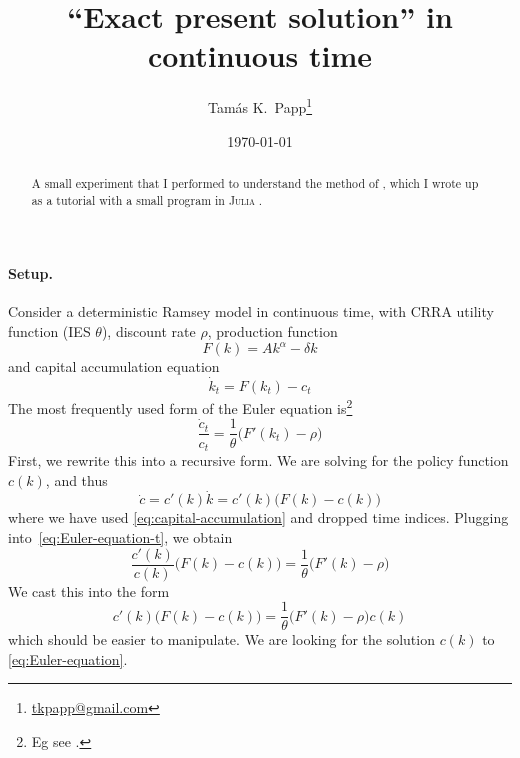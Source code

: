 \documentclass[a4paper,11pt]{article}
\begin{document}
\title{``Exact present solution'' in continuous time}
\author{Tam\'as K.~Papp\thanks{\url{tkpapp@gmail.com}}}
\date{\today}
\maketitle

\begin{abstract}
  A small experiment that I performed to understand the method of \textcite{den2015exact}, which I wrote up as a tutorial with a small program in \textsc{Julia} \parencite{bezanson17:_julia}.
\end{abstract}

\begin{center}
\end{center}
\paragraph{Setup.} Consider a deterministic Ramsey model in continuous time, with CRRA utility function (IES $\theta$), discount rate $\rho$, production function
\begin{equation}
  F(k) = A k^\alpha - \delta k
\end{equation}
and capital accumulation equation
\begin{equation}
  \label{eq:capital-accumulation}
  \dot{k}_t = F(k_t) - c_t
\end{equation}
The most frequently used form of the Euler equation is\footnote{Eg see \textcite[Chapter 8]{acemoglu2008introduction}.}
\begin{equation}
  \label{eq:Euler-equation-t}
  \frac{\dot{c}_t}{c_t} = \frac{1}{\theta} \bigl( F'(k_t) - \rho \bigr)
\end{equation}
First, we rewrite this into a recursive form. We are solving for the policy function $c(k)$, and thus
\begin{equation}
  \dot{c} = c'(k) \dot{k} = c'(k) \bigl( F(k) - c(k) \bigr)
\end{equation}
where we have used \eqref{eq:capital-accumulation} and dropped time indices. Plugging into~\eqref{eq:Euler-equation-t}, we obtain
\begin{equation}
  \label{eq:Euler-elasticity}
  \frac{c'(k)}{c(k)} \bigl( F(k) - c(k) \bigr) = \frac{1}{\theta} \bigl(F'(k)-\rho\bigr)
\end{equation}
We cast this into the form
\begin{equation}
  \label{eq:Euler-equation}
  c'(k) \bigl( F(k) - c(k) \bigr) = \frac{1}{\theta} \bigl(F'(k)-\rho\bigr) c(k)
\end{equation}
which should be easier to manipulate. We are looking for the solution $c(k)$ to \eqref{eq:Euler-equation}.
\end{document}
